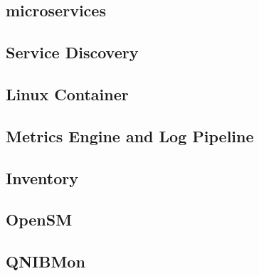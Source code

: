\subsection{microservices}



\subsection{Service Discovery}


\subsection{Linux Container}


\subsection{Metrics Engine and Log Pipeline}




\subsection{Inventory}


\subsection{OpenSM}


\subsection{QNIBMon}

